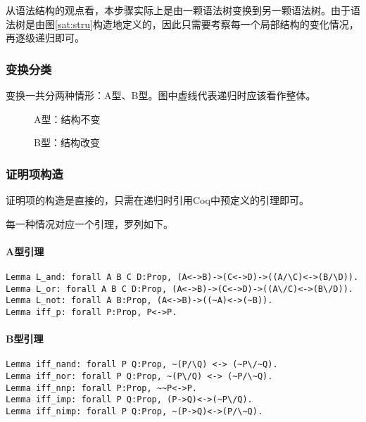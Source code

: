 从语法结构的观点看，本步骤实际上是由一颗语法树变换到另一颗语法树。由于语法树是由图\ref{sat:stru}构造地定义的，因此只需要考察每一个局部结构的变化情况，再逐级递归即可。

\subsubsection{变换分类}
变换一共分两种情形：A型、B型。图中虚线代表递归时应该看作整体。
\begin{figure}[!h]
\centering
{}
\caption{A型：结构不变}
\end{figure}

\begin{figure}[!h]
\centering
{}
\caption{B型：结构改变}
\end{figure}

\subsubsection{证明项构造}
证明项的构造是直接的，只需在递归时引用Coq中预定义的引理即可。

每一种情况对应一个引理，罗列如下。

\paragraph{A型引理}
\begin{verbatim}
Lemma L_and: forall A B C D:Prop, (A<->B)->(C<->D)->((A/\C)<->(B/\D)).
Lemma L_or: forall A B C D:Prop, (A<->B)->(C<->D)->((A\/C)<->(B\/D)).
Lemma L_not: forall A B:Prop, (A<->B)->((~A)<->(~B)).
Lemma iff_p: forall P:Prop, P<->P.
\end{verbatim}

\paragraph{B型引理}
\begin{verbatim}
Lemma iff_nand: forall P Q:Prop, ~(P/\Q) <-> (~P\/~Q).
Lemma iff_nor: forall P Q:Prop, ~(P\/Q) <-> (~P/\~Q).
Lemma iff_nnp: forall P:Prop, ~~P<->P.
Lemma iff_imp: forall P Q:Prop, (P->Q)<->(~P\/Q).
Lemma iff_nimp: forall P Q:Prop, ~(P->Q)<->(P/\~Q).
\end{verbatim}

